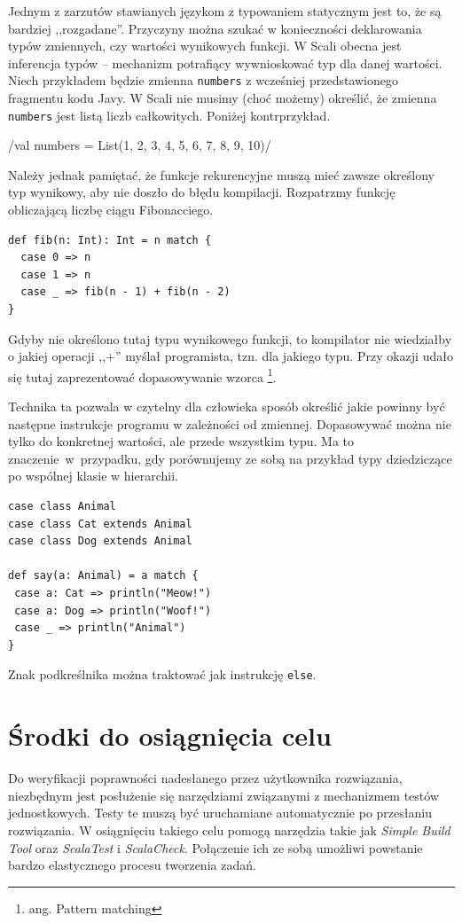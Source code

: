 \documentclass[wimgr]{xmgr}
\begin{document}
Jednym z zarzutów stawianych językom z typowaniem statycznym jest to, że są bardziej ,,rozgadane''. Przyczyny można szukać w konieczności deklarowania typów zmiennych, czy wartości wynikowych funkcji. W Scali obecna jest inferencja typów -- mechanizm potrafiący wywnioskować typ dla danej wartości. Niech przykładem będzie zmienna \texttt{numbers} z wcześniej przedstawionego fragmentu kodu Javy. W Scali nie musimy (choć możemy) określić, że zmienna \texttt{numbers} jest listą liczb całkowitych. Poniżej kontrprzykład.

/val numbers = List(1, 2, 3, 4, 5, 6, 7, 8, 9, 10)/

Należy jednak pamiętać, że funkcje rekurencyjne muszą mieć zawsze określony typ wynikowy, aby nie doszło do błędu kompilacji. Rozpatrzmy funkcję obliczającą liczbę ciągu Fibonacciego.

\begin{verbatim}
def fib(n: Int): Int = n match {
  case 0 => n
  case 1 => n
  case _ => fib(n - 1) + fib(n - 2)
}
\end{verbatim}

Gdyby nie określono tutaj typu wynikowego funkcji, to kompilator nie wiedziałby o jakiej operacji ,,+'' myślał programista, tzn. dla jakiego typu. Przy okazji udało się tutaj zaprezentować dopasowywanie wzorca \footnote{ang. Pattern matching}.

Technika ta pozwala w czytelny dla człowieka sposób określić jakie powinny być następne instrukcje programu w zależności od zmiennej. Dopasowywać można nie tylko do konkretnej wartości, ale przede wszystkim typu. Ma to znaczenie~w~przypadku, gdy porównujemy ze sobą na przykład typy dziedziczące po wspólnej klasie w hierarchii.

\begin{verbatim}
case class Animal
case class Cat extends Animal
case class Dog extends Animal

def say(a: Animal) = a match {
 case a: Cat => println("Meow!")
 case a: Dog => println("Woof!")
 case _ => println("Animal")
}
\end{verbatim}
\label{patternMatching:example}
Znak podkreślnika można traktować jak instrukcję \texttt{else}.

\section{Środki do osiągnięcia celu}

Do weryfikacji poprawności nadesłanego przez użytkownika rozwiązania, niezbędnym jest posłużenie się narzędziami związanymi z mechanizmem testów jednostkowych. Testy te muszą być uruchamiane automatycznie po przesłaniu rozwiązania. W osiągnięciu takiego celu pomogą narzędzia takie jak \textit{Simple Build Tool} oraz \textit{ScalaTest} i \textit{ScalaCheck}. Połączenie ich ze sobą umożliwi powstanie bardzo elastycznego procesu tworzenia zadań. 
\end{document}
